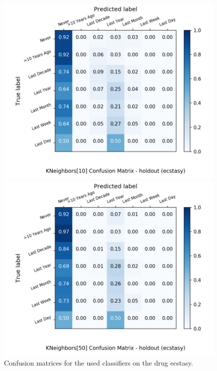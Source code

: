 \begin{figure}[H]
\begin{minipage}[b]{0.32\textwidth}
		\includegraphics[width=1.1\textwidth]{Plots/drugs/ecstasy_KNeighbors_10_balance_False_holdout.png}
  \end{minipage}
	\begin{minipage}[b]{0.32\textwidth}
		\includegraphics[width=1.1\textwidth]{Plots/drugs/ecstasy_KNeighbors_50_balance_False_holdout.png}
  \end{minipage}
	\caption{Confusion matrices for the used classifiers on the drug ecstasy.}
\end{figure}

